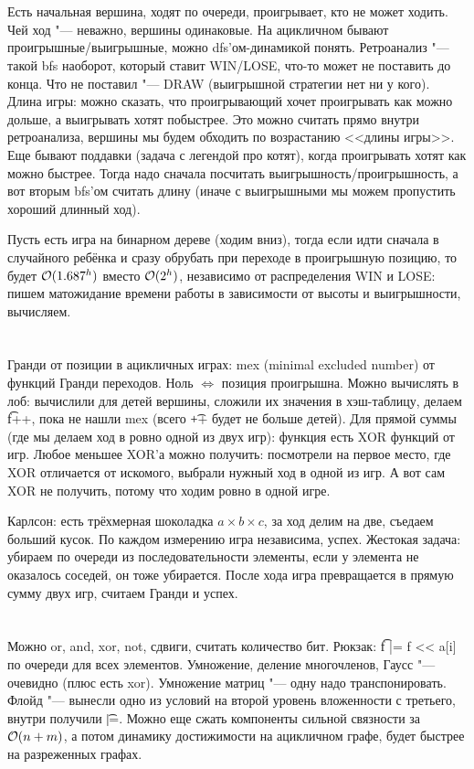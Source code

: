 \section{} %
Есть начальная вершина, ходят по очереди, проигрывает, кто не может ходить.
Чей ход "--- неважно, вершины одинаковые.
На ацикличном бывают проигрышные/выигрышные, можно dfs'ом-динамикой понять.
Ретроанализ "--- такой bfs наоборот, который ставит WIN/LOSE, что-то может не поставить до конца.
Что не поставил "--- DRAW (выигрышной стратегии нет ни у кого).
Длина игры: можно сказать, что проигрывающий хочет проигрывать как можно дольше, а выигрывать хотят побыстрее.
Это можно считать прямо внутри ретроанализа, вершины мы будем обходить по возрастанию <<длины игры>>.
Еще бывают поддавки (задача с легендой про котят), когда проигрывать хотят как можно быстрее.
Тогда надо сначала посчитать выигрышность/проигрышность, а вот вторым bfs'ом считать длину (иначе с выигрышными мы можем пропустить хороший длинный ход).

Пусть есть игра на бинарном дереве (ходим вниз), тогда если идти сначала в случайного ребёнка и сразу обрубать при переходе в проигрышную позицию, то будет $\mathcal{O}(1.687^h)$ вместо $\mathcal{O}(2^h)$,
независимо от распределения WIN и LOSE: пишем матожидание времени работы в зависимости от высоты и выигрышности, вычисляем.

\section{} %
Гранди от позиции в ацикличных играх: mex (minimal excluded number) от функций Гранди переходов.
Ноль $\iff$ позиция проигрышна.
Можно вычислять в лоб: вычислили для детей вершины, сложили их значения в хэш-таблицу, делаем \t{f++}, пока не нашли mex (всего \t{++} будет не больше детей).
Для прямой суммы (где мы делаем ход в ровно одной из двух игр): функция есть XOR функций от игр.
Любое меньшее XOR'а можно получить: посмотрели на первое место, где XOR отличается от искомого, выбрали нужный ход в одной из игр.
А вот сам XOR не получить, потому что ходим ровно в одной игре.

Карлсон: есть трёхмерная шоколадка $a \times b \times c$, за ход делим на две, съедаем больший кусок.
По каждом измерению игра независима, успех.
Жестокая задача: убираем по очереди из последовательности элементы, если у элемента не оказалось соседей, он тоже убирается.
После хода игра превращается в прямую сумму двух игр, считаем Гранди и успех.

\section{} %
Можно or, and, xor, not, сдвиги, считать количество бит.
Рюкзак: \t{f |= f << a[i]} по очереди для всех элементов.
Умножение, деление многочленов, Гаусс "--- очевидно (плюс есть xor).
Умножение матриц "--- одну надо транспонировать.
Флойд "--- вынесли одно из условий на второй уровень вложенности с третьего, внутри получили \t{|=}.
Можно еще сжать компоненты сильной связности за $\mathcal{O}(n+m)$, а потом динамику достижимости на ацикличном графе, будет быстрее на разреженных графах.

